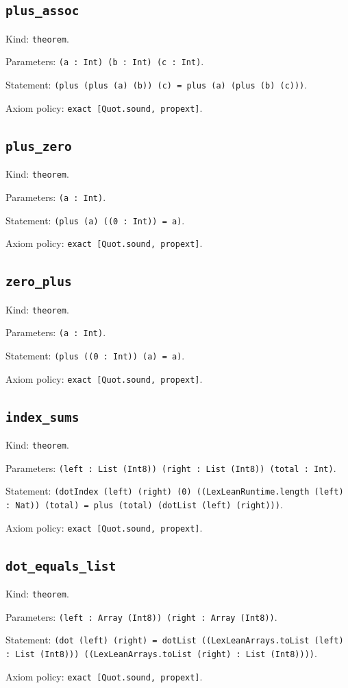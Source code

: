 \documentclass[11pt]{article}
\begin{document}
\subsection*{\texttt{plus\_assoc}}
\noindent Kind: \texttt{theorem}.\par
\noindent Parameters: \texttt{(a : Int) (b : Int) (c : Int)}.\par
\noindent Statement: \texttt{(plus (plus (a) (b)) (c) = plus (a) (plus (b) (c)))}.\par
\noindent Axiom policy: \texttt{exact [Quot.sound, propext]}.\par
\subsection*{\texttt{plus\_zero}}
\noindent Kind: \texttt{theorem}.\par
\noindent Parameters: \texttt{(a : Int)}.\par
\noindent Statement: \texttt{(plus (a) ((0 : Int)) = a)}.\par
\noindent Axiom policy: \texttt{exact [Quot.sound, propext]}.\par
\subsection*{\texttt{zero\_plus}}
\noindent Kind: \texttt{theorem}.\par
\noindent Parameters: \texttt{(a : Int)}.\par
\noindent Statement: \texttt{(plus ((0 : Int)) (a) = a)}.\par
\noindent Axiom policy: \texttt{exact [Quot.sound, propext]}.\par
\subsection*{\texttt{index\_sums}}
\noindent Kind: \texttt{theorem}.\par
\noindent Parameters: \texttt{(left : List (Int8)) (right : List (Int8)) (total : Int)}.\par
\noindent Statement: \texttt{(dotIndex (left) (right) (0) ((LexLeanRuntime.length (left) : Nat)) (total) = plus (total) (dotList (left) (right)))}.\par
\noindent Axiom policy: \texttt{exact [Quot.sound, propext]}.\par
\subsection*{\texttt{dot\_equals\_list}}
\noindent Kind: \texttt{theorem}.\par
\noindent Parameters: \texttt{(left : Array (Int8)) (right : Array (Int8))}.\par
\noindent Statement: \texttt{(dot (left) (right) = dotList ((LexLeanArrays.toList (left) : List (Int8))) ((LexLeanArrays.toList (right) : List (Int8))))}.\par
\noindent Axiom policy: \texttt{exact [Quot.sound, propext]}.\par
\end{document}
